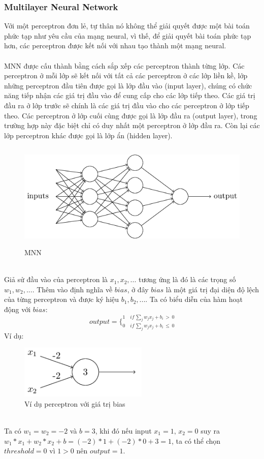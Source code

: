 \subsubsection{Multilayer Neural Network}
Với một perceptron đơn lẻ, tự thân nó không thể giải quyết được một bài toán 
phức tạp như yêu cầu của mạng neural, vì thế, để giải quyết bài toán phức tạp 
hơn, các perceptron được kết nối với nhau tạo thành một mạng neural.\\\\
MNN được cấu thành bằng cách sắp xếp các perceptron thành 
từng lớp. Các perceptron ở mỗi lớp sẽ kết nối với tất cả các perceptron ở các 
lớp liền kề, lớp những perceptron đầu tiên được gọi là lớp đầu vào (input layer), 
chúng có chức năng tiếp nhận các giá trị đầu vào để cung cấp cho các lớp tiếp 
theo. Các giá trị đầu ra ở lớp trước sẽ chính là các giá trị đầu vào cho 
các perceptron ở lớp tiếp theo. Các perceptron ở lớp cuối cùng được gọi là lớp 
đầu ra (output layer), trong trường hợp này đặc biệt chỉ có duy nhất một 
perceptron ở lớp đầu ra. Còn lại các lớp perceptron khác được gọi là lớp ẩn 
(hidden layer).\\
\begin{figure}[h!]
\centering
\includegraphics[height=2in, keepaspectratio=true]{multilayerneuralnetwork.png}
\caption{MNN}
\end{figure}\\
Giả sử đầu vào của perceptron là $x_1, x_2, ...$ tương ứng là đó là các trọng 
số $w_1, w_2, ...$. Thêm vào định nghĩa về $bias$, ở đây $bias$ là một giá trị 
đại diện độ lệch của từng perceptron và được ký hiệu $b_1, b_2, ...$. Ta có 
biểu diễn của hàm hoạt động với $bias$:\\
\[
  output = 
  \bigg\{
    _{0 \quad if \, \sum_j w_j x_j + b_i\, \leq \, 0}
    ^{1 \quad if \, \sum_j w_j x_j + b_i\, > \, 0}
\]
Ví dụ:\\
\begin{figure}[h!]
\centering
\includegraphics[height=1in, keepaspectratio=true]{exmln.png}
\caption{Ví dụ perceptron với giá trị bias}
\end{figure}\\
Ta có $w_1=w_2=-2$ và $b=3$, khi đó nếu input $x_1=1,\, x_2=0$ suy ra $ 
w_1*x_1+w_2*x_2+b=(-2)*1+(-2)*0+3=1$, ta có thể chọn $threshold=0$ vì $1>0$
nên $output=1$.

